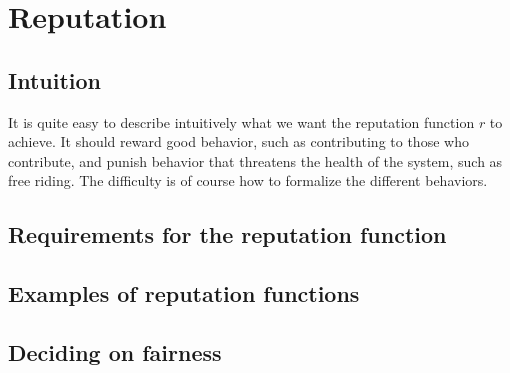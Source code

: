 \chapter{Reputation}\label{chapter:reputation}
\section{Intuition}
It is quite easy to describe intuitively what we want the reputation function $r$ to achieve. It should reward good behavior, such as contributing to those who contribute, and punish behavior that threatens the health of the system, such as free riding. The difficulty is of course how to formalize the different behaviors.

\section{Requirements for the reputation function}\label{section:requirements_reputation}

\section{Examples of reputation functions}\label{section:examples_reputation_functions}

\section{Deciding on fairness}
